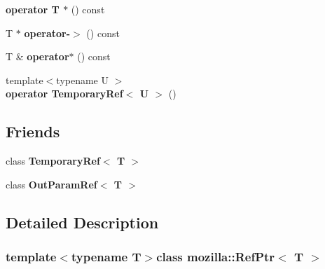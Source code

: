 \begin{DoxyCompactItemize}
\item 
\hypertarget{classmozilla_1_1_ref_ptr_a5d55f3566ea2889e53ed218879a30955}{{\bfseries operator T $\ast$} () const }\label{classmozilla_1_1_ref_ptr_a5d55f3566ea2889e53ed218879a30955}

\item 
\hypertarget{classmozilla_1_1_ref_ptr_a604d6e63089a0d8ba820ba7d004af3c9}{T $\ast$ {\bfseries operator-\/$>$} () const }\label{classmozilla_1_1_ref_ptr_a604d6e63089a0d8ba820ba7d004af3c9}

\item 
\hypertarget{classmozilla_1_1_ref_ptr_a1b2ce0119e31a55423dda6f6759229d0}{T \& {\bfseries operator$\ast$} () const }\label{classmozilla_1_1_ref_ptr_a1b2ce0119e31a55423dda6f6759229d0}

\item 
\hypertarget{classmozilla_1_1_ref_ptr_a6c8827d3a36d383b4d1d8ebb1a735bdb}{{\footnotesize template$<$typename U $>$ }\\{\bfseries operator Temporary\-Ref$<$ U $>$} ()}\label{classmozilla_1_1_ref_ptr_a6c8827d3a36d383b4d1d8ebb1a735bdb}

\end{DoxyCompactItemize}
\subsection*{Friends}
\begin{DoxyCompactItemize}
\item 
\hypertarget{classmozilla_1_1_ref_ptr_a47db1a37a72d9f41f11d3e1229f45a2f}{class {\bfseries Temporary\-Ref$<$ T $>$}}\label{classmozilla_1_1_ref_ptr_a47db1a37a72d9f41f11d3e1229f45a2f}

\item 
\hypertarget{classmozilla_1_1_ref_ptr_a1be1c0e444ec5c29a9155888ba41e2e6}{class {\bfseries Out\-Param\-Ref$<$ T $>$}}\label{classmozilla_1_1_ref_ptr_a1be1c0e444ec5c29a9155888ba41e2e6}

\end{DoxyCompactItemize}


\subsection{Detailed Description}
\subsubsection*{template$<$typename T$>$class mozilla\-::\-Ref\-Ptr$<$ T $>$}

